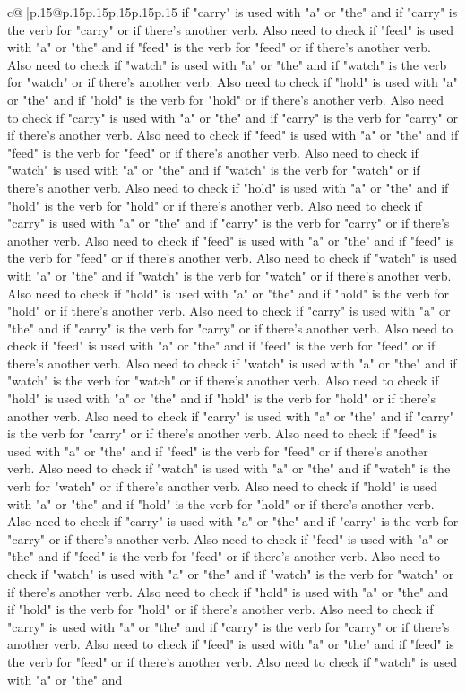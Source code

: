 \documentclass{article}
\begin{document}
{\begin{supertabular}{c@{$\;$}|p{.15\linewidth}@{}p{.15\linewidth}p{.15\linewidth}p{.15\linewidth}p{.15\linewidth}p{.15\linewidth}}
{{{if "carry" is used with "a" or "the" and if "carry" is the verb for "carry" or if there's another verb. Also need to check if "feed" is used with "a" or "the" and if "feed" is the verb for "feed" or if there's another verb. Also need to check if "watch" is used with "a" or "the" and if "watch" is the verb for "watch" or if there's another verb. Also need to check if "hold" is used with "a" or "the" and if "hold" is the verb for "hold" or if there's another verb. Also need to check if "carry" is used with "a" or "the" and if "carry" is the verb for "carry" or if there's another verb. Also need to check if "feed" is used with "a" or "the" and if "feed" is the verb for "feed" or if there's another verb. Also need to check if "watch" is used with "a" or "the" and if "watch" is the verb for "watch" or if there's another verb. Also need to check if "hold" is used with "a" or "the" and if "hold" is the verb for "hold" or if there's another verb. Also need to check if "carry" is used with "a" or "the" and if "carry" is the verb for "carry" or if there's another verb. Also need to check if "feed" is used with "a" or "the" and if "feed" is the verb for "feed" or if there's another verb. Also need to check if "watch" is used with "a" or "the" and if "watch" is the verb for "watch" or if there's another verb. Also need to check if "hold" is used with "a" or "the" and if "hold" is the verb for "hold" or if there's another verb. Also need to check if "carry" is used with "a" or "the" and if "carry" is the verb for "carry" or if there's another verb. Also need to check if "feed" is used with "a" or "the" and if "feed" is the verb for "feed" or if there's another verb. Also need to check if "watch" is used with "a" or "the" and if "watch" is the verb for "watch" or if there's another verb. Also need to check if "hold" is used with "a" or "the" and if "hold" is the verb for "hold" or if there's another verb. Also need to check if "carry" is used with "a" or "the" and if "carry" is the verb for "carry" or if there's another verb. Also need to check if "feed" is used with "a" or "the" and if "feed" is the verb for "feed" or if there's another verb. Also need to check if "watch" is used with "a" or "the" and if "watch" is the verb for "watch" or if there's another verb. Also need to check if "hold" is used with "a" or "the" and if "hold" is the verb for "hold" or if there's another verb. Also need to check if "carry" is used with "a" or "the" and if "carry" is the verb for "carry" or if there's another verb. Also need to check if "feed" is used with "a" or "the" and if "feed" is the verb for "feed" or if there's another verb. Also need to check if "watch" is used with "a" or "the" and if "watch" is the verb for "watch" or if there's another verb. Also need to check if "hold" is used with "a" or "the" and if "hold" is the verb for "hold" or if there's another verb. Also need to check if "carry" is used with "a" or "the" and if "carry" is the verb for "carry" or if there's another verb. Also need to check if "feed" is used with "a" or "the" and if "feed" is the verb for "feed" or if there's another verb. Also need to check if "watch" is used with "a" or "the" and }}}
\end{supertabular}}
\end{document}
